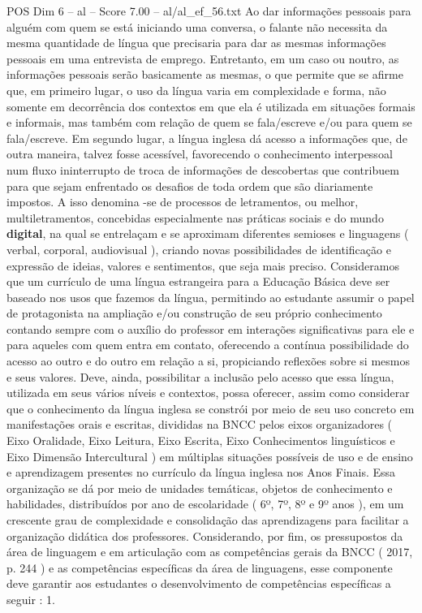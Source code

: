 \begin{textsample}{POS Dim 6 – al – Score 7.00 – al/al\_ef\_56.txt}
Ao dar informações pessoais para alguém com quem se está iniciando uma conversa, o falante não necessita da mesma quantidade de língua que precisaria para dar as mesmas informações pessoais em uma entrevista de emprego.
Entretanto, em um caso ou noutro, as informações pessoais serão basicamente as mesmas, o que permite que se afirme que, em primeiro lugar, o uso da língua varia em complexidade e forma, não somente em decorrência dos contextos em que ela é utilizada em situações formais e informais, mas também com relação de quem se fala/escreve e/ou para quem se fala/escreve.
Em segundo lugar, a língua inglesa dá acesso a informações que, de outra maneira, talvez fosse acessível, favorecendo o conhecimento interpessoal num fluxo ininterrupto de troca de informações de descobertas que contribuem para que sejam enfrentado os desafios de toda ordem que são diariamente impostos.
A isso denomina -se de processos de letramentos, ou melhor, multiletramentos, concebidas especialmente nas práticas sociais e do mundo \textbf{digital}, na qual se entrelaçam e se aproximam diferentes semioses e linguagens ( verbal, corporal, audiovisual ), criando novas possibilidades de identificação e expressão de ideias, valores e sentimentos, que seja mais preciso.
Consideramos que um currículo de uma língua estrangeira para a Educação Básica deve ser baseado nos usos que fazemos da língua, permitindo ao estudante assumir o papel de protagonista na ampliação e/ou construção de seu próprio conhecimento contando sempre com o auxílio do professor em interações significativas para ele e para aqueles com quem entra em contato, oferecendo a contínua possibilidade do acesso ao outro e do outro em relação a si, propiciando reflexões sobre si mesmos e seus valores.
Deve, ainda, possibilitar a inclusão pelo acesso que essa língua, utilizada em seus vários níveis e contextos, possa oferecer, assim como considerar que o conhecimento da língua inglesa se constrói por meio de seu uso concreto em manifestações orais e escritas, divididas na BNCC pelos eixos organizadores ( Eixo Oralidade, Eixo Leitura, Eixo Escrita, Eixo Conhecimentos linguísticos e Eixo Dimensão Intercultural ) em múltiplas situações possíveis de uso e de ensino e aprendizagem presentes no currículo da língua inglesa nos Anos Finais.
Essa organização se dá por meio de unidades temáticas, objetos de conhecimento e habilidades, distribuídos por ano de escolaridade ( 6º, 7º, 8º e 9º anos ), em um crescente grau de complexidade e consolidação das aprendizagens para facilitar a organização didática dos professores.
Considerando, por fim, os pressupostos da área de linguagem e em articulação com as competências gerais da BNCC ( 2017, p. 244 ) e as competências específicas da área de linguagens, esse componente deve garantir aos estudantes o desenvolvimento de competências específicas a seguir : 1.

\end{textsample}
